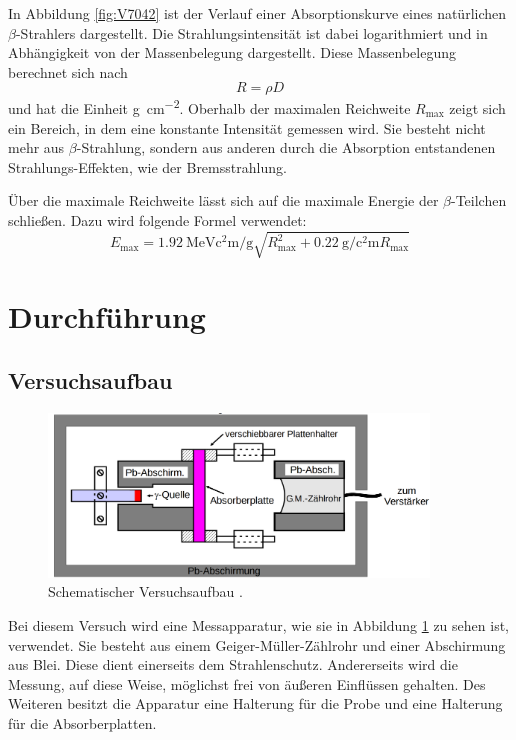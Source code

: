 \documentclass[
  bibliography=totoc,     %
  captions=tableheading,  %
  titlepage=firstiscover, %
]{scrartcl}
\begin{document}
In Abbildung \ref{fig:V7042} ist der Verlauf einer Absorptionskurve eines natürlichen
$\beta$-Strahlers dargestellt. Die Strahlungsintensität ist dabei logarithmiert
und in Abhängigkeit von der Massenbelegung dargestellt. Diese Massenbelegung
berechnet sich nach
\begin{equation}
  R = \rho D
  \label{eqn:massenbel}
\end{equation}
und hat die Einheit \si{\gram\per\square\centi\meter}.
Oberhalb der maximalen Reichweite $R_\mathup{max}$ zeigt sich ein Bereich,
in dem eine konstante Intensität gemessen wird. Sie besteht nicht mehr aus
$\beta$-Strahlung, sondern aus anderen durch die Absorption entstandenen
Strahlungs-Effekten, wie der Bremsstrahlung.

\noindent
Über die maximale Reichweite lässt sich auf die maximale Energie der $\beta$-Teilchen
schließen. Dazu wird folgende Formel verwendet:
\begin{equation}
  E_\mathup{max} = \SI{1.92}{\mega\electronvolt\square\centi\meter\per\gram} \sqrt{R_\mathup{max}^2 + \SI{0.22}{\gram\per\square\centi\meter} R_\mathup{max}}
  \label{eqn:E_max}
\end{equation}


\section{Durchführung}
\label{sec:durchführung}
\subsection{Versuchsaufbau}
\begin{figure}[htb]
  \centering
  \includegraphics[width=0.9\textwidth]{V7043.png}
  \caption{Schematischer Versuchsaufbau \cite{anleitung}.}
  \label{fig:V7043}
\end{figure}
Bei diesem Versuch wird eine Messapparatur, wie sie in Abbildung \ref{fig:V7043}
zu sehen ist, verwendet. Sie besteht aus einem Geiger-Müller-Zählrohr und einer
Abschirmung aus Blei. Diese dient einerseits dem Strahlenschutz. Andererseits
wird die Messung, auf diese Weise, möglichst frei von äußeren Einflüssen gehalten.
Des Weiteren besitzt die Apparatur eine Halterung für die Probe und eine Halterung
für die Absorberplatten.
\end{document}
